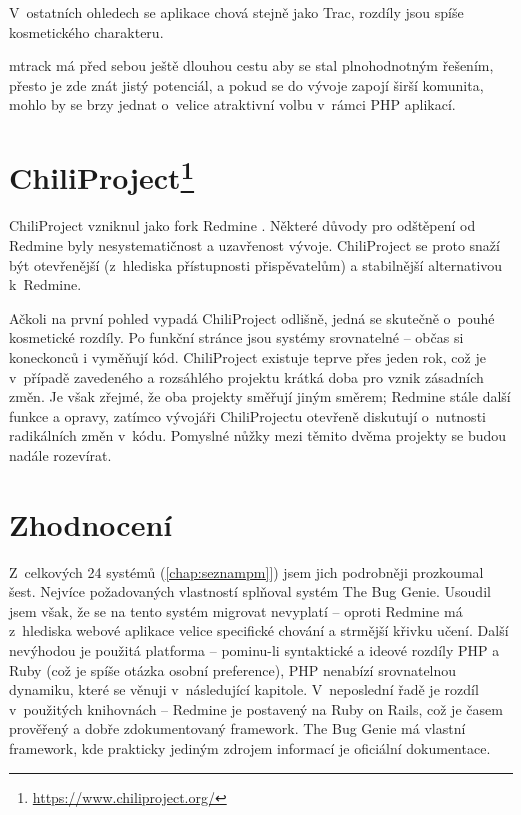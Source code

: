 \documentclass[thesis=B,czech]{FITthesis}[2012/05/02]
\begin{document}
V~ostatních ohledech se aplikace chová stejně jako Trac, rozdíly jsou
spíše kosmetického charakteru.

mtrack má před sebou ještě dlouhou cestu aby se stal plnohodnotným
řešením, přesto je zde znát jistý potenciál, a pokud se do vývoje zapojí
širší komunita, mohlo by se brzy jednat o~velice atraktivní volbu
v~rámci PHP aplikací.

\section[ChiliProject]{ChiliProject\footnote{\url{https://www.chiliproject.org/}}}

ChiliProject vzniknul jako \gls{fork} Redmine
\citep{ChiliProjectWhyFork}. Některé důvody pro odštěpení od Redmine
byly nesystematičnost a uzavřenost vývoje. ChiliProject se proto snaží
být otevřenější (z~hlediska přístupnosti přispěvatelům) a stabilnější
alternativou k~Redmine.

Ačkoli na první pohled vypadá ChiliProject odlišně, jedná se skutečně
o~pouhé kosmetické rozdíly. Po funkční stránce jsou systémy srovnatelné -- občas
si koneckonců i vyměňují kód. ChiliProject existuje teprve přes jeden
rok, což je v~případě zavedeného a rozsáhlého projektu krátká doba pro
vznik zásadních změn. Je však zřejmé, že oba projekty směřují jiným
směrem; Redmine stále  další funkce a opravy, zatímco
vývojáři ChiliProjectu otevřeně diskutují o~nutnosti radikálních změn
v~kódu. Pomyslné nůžky mezi těmito dvěma projekty se budou nadále
rozevírat.

\section{Zhodnocení}

Z~celkových 24 systémů (\autoref{chap:seznampm}]) jsem jich podrobněji
prozkoumal šest. Nejvíce požadovaných vlastností splňoval systém The Bug
Genie. Usoudil jsem však, že se na tento systém migrovat nevyplatí --
oproti Redmine má z~hlediska webové aplikace velice specifické chování a
strmější křivku učení. Další nevýhodou je použitá platforma -- pominu-li
syntaktické a ideové rozdíly PHP a Ruby (což je spíše otázka osobní
preference), PHP nenabízí srovnatelnou dynamiku, které se věnuji
v~následující kapitole. V~neposlední řadě je
rozdíl v~použitých knihovnách -- Redmine je postavený na Ruby on Rails,
což je časem prověřený a dobře zdokumentovaný framework. The Bug Genie
má vlastní framework, kde prakticky jediným zdrojem informací je
oficiální dokumentace.
\end{document}
